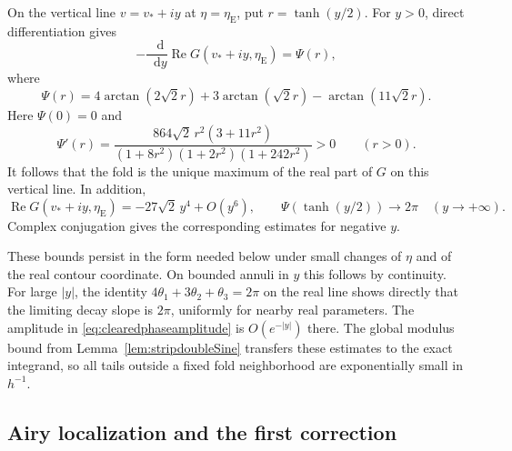 \documentclass[11pt,a4paper]{article}
\numberwithin{equation}{section}
\theoremstyle{definition}
\theoremstyle{remark}
\newcommand{\dd}{\mathop{}\!\mathrm d}
\begin{document}
On the vertical line $v=v_*+iy$ at $\eta=\eta_{\mathrm E}$,
put $r=\tanh(y/2)$. For $y>0$, direct differentiation gives
\begin{equation}
 -\frac{\dd}{\dd y}\operatorname{Re}G(v_*+iy,\eta_{\mathrm E})
 =\Psi(r),
 \label{eq:verticalphasegap}
\end{equation}
where
\[
 \Psi(r)=4\arctan(2\sqrt2r)
          +3\arctan(\sqrt2r)-\arctan(11\sqrt2r).
\]
Here $\Psi(0)=0$ and
\begin{equation}
 \Psi'(r)=
 \frac{864\sqrt2\,r^2(3+11r^2)}
 {(1+8r^2)(1+2r^2)(1+242r^2)}>0
 \qquad(r>0).
 \label{eq:verticalphasepositivity}
\end{equation}
It follows that the fold is the unique maximum of the real part
of $G$ on this vertical line. In addition,
\[
 \operatorname{Re}G(v_*+iy,\eta_{\mathrm E})
   =-27\sqrt2\,y^4+O(y^6),\qquad
 \Psi(\tanh(y/2))\longrightarrow2\pi
 \quad(y\to+\infty).
\]
Complex conjugation gives the corresponding estimates for
negative $y$.

These bounds persist in the form needed below under small
changes of $\eta$ and of the real contour coordinate. On bounded
annuli in $y$ this follows by continuity. For large $|y|$,
the identity
$4\theta_1+3\theta_2+\theta_3=2\pi$ on the real line
shows directly that the limiting decay slope is $2\pi$,
uniformly for nearby real parameters. The amplitude in
\eqref{eq:clearedphaseamplitude} is $O(e^{-|y|})$ there.
The global modulus bound from
Lemma~\ref{lem:stripdoubleSine} transfers these estimates to
the exact integrand, so all tails outside a fixed fold
neighborhood are exponentially small in $h^{-1}$.

\subsection{Airy localization and the first correction}
\end{document}
